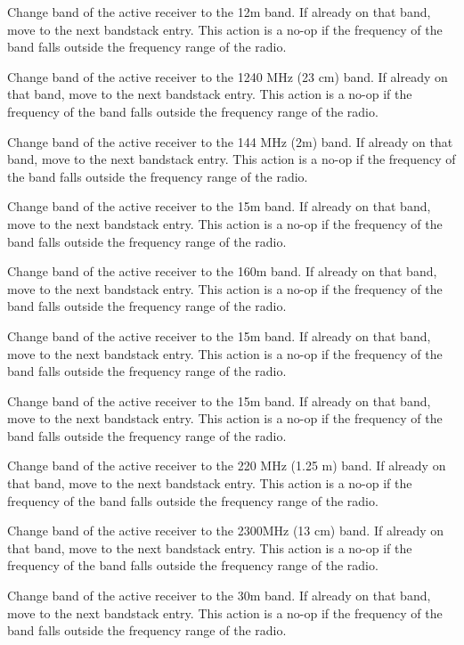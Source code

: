 \documentclass[12pt]{book}
\begin{document}
{Change band of the active receiver to the 12m band. If already on that band, move to
the next bandstack entry. This action is a no-op if the frequency of the band falls outside the frequency range
of the radio.}

{Change band of the active receiver to the 1240 MHz (23 cm) band. If already on that band, move to
the next bandstack entry. This action is a no-op if the frequency of the band falls outside the frequency range
of the radio.}

{Change band of the active receiver to the 144 MHz (2m) band. If already on that band, move to
the next bandstack entry. This action is a no-op if the frequency of the band falls outside the frequency range
of the radio.}

{Change band of the active receiver to the 15m band. If already on that band, move to
the next bandstack entry. This action is a no-op if the frequency of the band falls outside the frequency range
of the radio.}

{Change band of the active receiver to the 160m band. If already on that band, move to
the next bandstack entry. This action is a no-op if the frequency of the band falls outside the frequency range
of the radio.}

{Change band of the active receiver to the 15m band. If already on that band, move to
the next bandstack entry. This action is a no-op if the frequency of the band falls outside the frequency range
of the radio.}

{Change band of the active receiver to the 15m band. If already on that band, move to
the next bandstack entry. This action is a no-op if the frequency of the band falls outside the frequency range
of the radio.}

{Change band of the active receiver to the 220 MHz (1.25 m) band. If already on that band, move to
the next bandstack entry. This action is a no-op if the frequency of the band falls outside the frequency range
of the radio.}

{Change band of the active receiver to the 2300MHz (13 cm) band. If already on that band, move to
the next bandstack entry. This action is a no-op if the frequency of the band falls outside the frequency range
of the radio.}

{Change band of the active receiver to the 30m band. If already on that band, move to
the next bandstack entry. This action is a no-op if the frequency of the band falls outside the frequency range
of the radio.}
\end{document}
